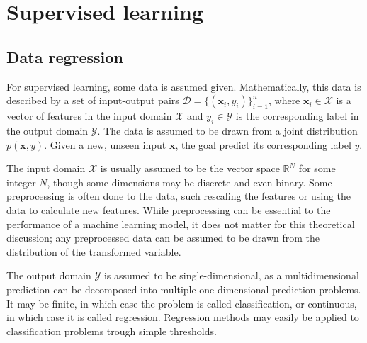 \section{Supervised learning}
\label{sec:supervised_learning}

\subsection{Data regression}
For supervised learning, some data is assumed given.
Mathematically, this data is described by a set of input-output pairs $\mathcal{D} = \{(\bm{x}_i, y_i)\}_{i=1}^n$, where $\bm{x}_i\in\mathcal{X}$ is a vector of features in the input domain $\mathcal{X}$ and $y_i\in\mathcal{Y}$ is the corresponding label in the output domain $\mathcal{Y}$.
The data is assumed to be drawn from a joint distribution $p(\bm{x}, y)$.
Given a new, unseen input $\bm{x}$, the goal predict its corresponding label $y$.

The input domain $\mathcal{X}$ is usually assumed to be the vector space $\mathbb{R}^N$ for some integer $N$, though some dimensions may be discrete and even binary.
Some preprocessing is often done to the data, such rescaling the features or using the data to calculate new features.
While preprocessing can be essential to the performance of a machine learning model, it does not matter for this theoretical discussion; any preprocessed data can be assumed to be drawn from the distribution of the transformed variable.

The output domain $\mathcal{Y}$ is assumed to be single-dimensional, as a multidimensional prediction can be decomposed into multiple one-dimensional prediction problems.
It may be finite, in which case the problem is called classification, or continuous, in which case it is called regression.
Regression methods may easily be applied to classification problems trough simple thresholds.

